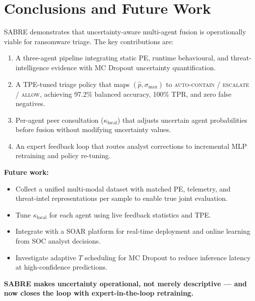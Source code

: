 \documentclass[12pt,a4paper]{article}
\begin{document}
\section{Conclusions and Future Work}
\label{sec:conc}

SABRE demonstrates that uncertainty-aware multi-agent fusion is operationally viable
for ransomware triage. The key contributions are:

\begin{enumerate}[leftmargin=2em]
  \item A three-agent pipeline integrating static PE, runtime behavioural, and
    threat-intelligence evidence with MC Dropout uncertainty quantification.
  \item A TPE-tuned triage policy that maps $(\hat{p}, \sigma_{\max})$ to
    \textsc{auto-contain} / \textsc{escalate} / \textsc{allow}, achieving 97.2\%
    balanced accuracy, 100\% TPR, and zero false negatives.
  \item Per-agent peer consultation ($\kappa_{\text{local}}$) that adjusts uncertain
    agent probabilities before fusion without modifying uncertainty values.
  \item An expert feedback loop that routes analyst corrections to incremental MLP
    retraining and policy re-tuning.
\end{enumerate}

\textbf{Future work:}
\begin{itemize}[leftmargin=2em]
  \item Collect a unified multi-modal dataset with matched PE, telemetry, and
    threat-intel representations per sample to enable true joint evaluation.
  \item Tune $\kappa_{\text{local}}$ for each agent using live feedback statistics
    and TPE.
  \item Integrate with a SOAR platform for real-time deployment and online learning
    from SOC analyst decisions.
  \item Investigate adaptive $T$ scheduling for MC Dropout to reduce inference latency
    at high-confidence predictions.
\end{itemize}

\begin{tcolorbox}[notebox, title=Bottom Line]
\small\bfseries
SABRE makes uncertainty operational, not merely descriptive — and now closes the loop
with expert-in-the-loop retraining.
\end{tcolorbox}
\end{document}

